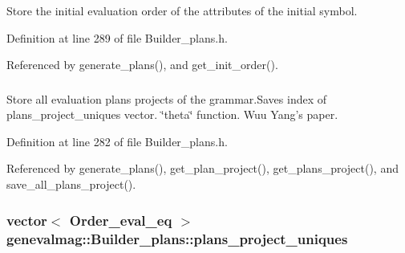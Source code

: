 Store the initial evaluation order of the attributes of the initial symbol. 



Definition at line 289 of file Builder\_\-plans.h.



Referenced by generate\_\-plans(), and get\_\-init\_\-order().

\hypertarget{classgenevalmag_1_1Builder__plans_ab353b4b6e3b9c72a8fb61ee376a4f76c}{
\subsubsection[{plans\_\-project}]{}}
\label{classgenevalmag_1_1Builder__plans_ab353b4b6e3b9c72a8fb61ee376a4f76c}


Store all evaluation plans projects of the grammar.Saves index of plans\_\-project\_\-uniques vector. \char`\"{}theta\char`\"{} function. Wuu Yang's paper. 



Definition at line 282 of file Builder\_\-plans.h.



Referenced by generate\_\-plans(), get\_\-plan\_\-project(), get\_\-plans\_\-project(), and save\_\-all\_\-plans\_\-project().

\hypertarget{classgenevalmag_1_1Builder__plans_a6a64fd58a3ce6c2f4b6c69df14ffee6e}{
\subsubsection[{plans\_\-project\_\-uniques}]{\setlength{\rightskip}{0pt plus 5cm}vector$<$ {\bf Order\_\-eval\_\-eq} $>$ {\bf genevalmag::Builder\_\-plans::plans\_\-project\_\-uniques}}}
\label{classgenevalmag_1_1Builder__plans_a6a64fd58a3ce6c2f4b6c69df14ffee6e}


